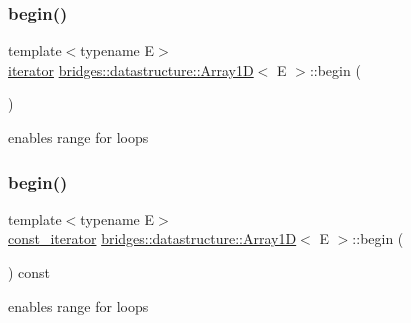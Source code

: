 \subsubsection{\texorpdfstring{begin()}{begin()}\hspace{0.1cm}{\footnotesize\ttfamily [1/2]}}
{\footnotesize\ttfamily template$<$typename E$>$ \\
\hyperlink{classbridges_1_1datastructure_1_1_array1_d_1_1iterator}{iterator} \hyperlink{classbridges_1_1datastructure_1_1_array1_d}{bridges\+::datastructure\+::\+Array1D}$<$ E $>$\+::begin (\begin{DoxyParamCaption}{ }\end{DoxyParamCaption})\hspace{0.3cm}{\ttfamily [inline]}}



enables range for loops 

\mbox{\label{classbridges_1_1datastructure_1_1_array1_d_a61e7a77165129de2016633ce24284417}} 
\subsubsection{\texorpdfstring{begin()}{begin()}\hspace{0.1cm}{\footnotesize\ttfamily [2/2]}}
{\footnotesize\ttfamily template$<$typename E$>$ \\
\hyperlink{classbridges_1_1datastructure_1_1_array1_d_1_1const__iterator}{const\+\_\+iterator} \hyperlink{classbridges_1_1datastructure_1_1_array1_d}{bridges\+::datastructure\+::\+Array1D}$<$ E $>$\+::begin (\begin{DoxyParamCaption}{ }\end{DoxyParamCaption}) const\hspace{0.3cm}{\ttfamily [inline]}}



enables range for loops 

\mbox{\label{classbridges_1_1datastructure_1_1_array1_d_a238e21eb9afcd0f32e3612b36b7d1a2a}} 
